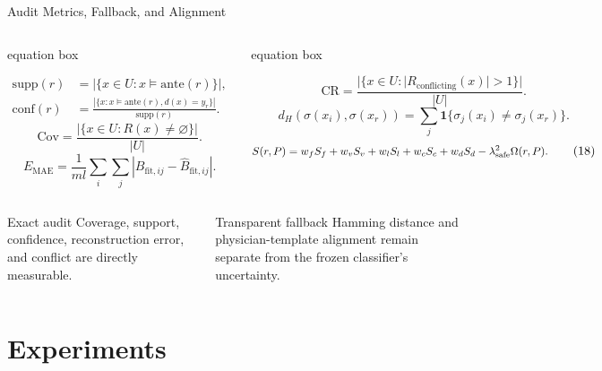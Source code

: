 \documentclass[aspectratio=169,xcolor=dvipsnames]{beamer}
\begin{document}
\begin{frame}{Audit Metrics, Fallback, and Alignment}
\scriptsize
\begin{columns}[T,onlytextwidth]
  \begin{beamercolorbox}[wd=\linewidth,sep=0.34em]{equation box}
  {\scriptsize
  \[
  \begin{aligned}
  \mathrm{supp}(r)&=|\{x\in U:x\models\mathrm{ante}(r)\}|,\\[-0.1em]
  \mathrm{conf}(r)&=
  \frac{|\{x:x\models\mathrm{ante}(r),d(x)=y_r\}|}{\mathrm{supp}(r)}.
  \end{aligned}
  \tag{13}
  \]
  \[
  \mathrm{Cov}=\frac{|\{x\in U:R(x)\ne\varnothing\}|}{|U|}.
  \tag{14}
  \]
  \[
  E_{\mathrm{MAE}}=\frac{1}{ml}\sum_i\sum_j
  \left|B_{\mathrm{fit},ij}-\widehat{B}_{\mathrm{fit},ij}\right|.
  \tag{15}
  \]
  \par}
  \end{beamercolorbox}

  \begin{beamercolorbox}[wd=\linewidth,sep=0.34em]{equation box}
  {\scriptsize
  \[
  \mathrm{CR}=
  \frac{|\{x\in U:|R_{\mathrm{conflicting}}(x)|>1\}|}{|U|}.
  \tag{16}
  \]
  \[
  d_H(\sigma(x_i),\sigma(x_r))=
  \sum_j\mathbf{1}\{\sigma_j(x_i)\ne\sigma_j(x_r)\}.
  \tag{17}
  \]
  \[
  \scalebox{0.88}{$\displaystyle
  S(r,P)=w_fS_f+w_vS_v+w_lS_l+w_cS_c+w_dS_d
  -\lambda_{\mathrm{safe}}^2\Omega(r,P).$}
  \tag{18}
  \]
  \par}
  \end{beamercolorbox}
\end{columns}
\vspace{0.15em}
\begin{columns}[T,onlytextwidth]
  \begin{block}{Exact audit}
  \scriptsize
  Coverage, support, confidence, reconstruction error, and conflict are
  directly measurable.
  \end{block}
  \begin{exampleblock}{Transparent fallback}
  \scriptsize
  Hamming distance and physician-template alignment remain separate from the
  frozen classifier's uncertainty.
  \end{exampleblock}
\end{columns}
\end{frame}

\section{Experiments}
\end{document}
